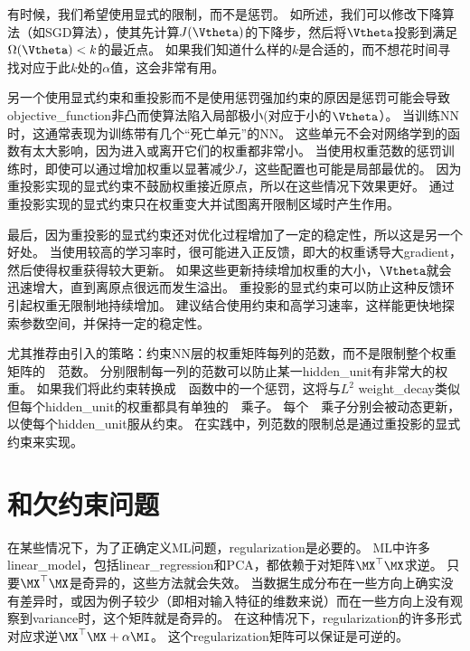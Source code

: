 
有时候，我们希望使用显式的限制，而不是惩罚。
如所述，我们可以修改下降算法（如\gls{SGD}算法），使其先计算$J(\Vtheta)$的下降步，然后将$\Vtheta$投影到满足$\Omega(\Vtheta) < k$的最近点。
如果我们知道什么样的$k$是合适的，而不想花时间寻找对应于此$k$处的$\alpha$值，这会非常有用。

另一个使用显式约束和重投影而不是使用惩罚强加约束的原因是惩罚可能会导致\gls{objective_function}非凸而使算法陷入局部极小(对应于小的$\Vtheta$）。
当训练\gls{NN}时，这通常表现为训练带有几个``死亡单元''的\gls{NN}。
这些单元不会对网络学到的函数有太大影响，因为进入或离开它们的权重都非常小。
当使用权重范数的惩罚训练时，即使可以通过增加权重以显著减少$J$，这些配置也可能是局部最优的。
因为重投影实现的显式约束不鼓励权重接近原点，所以在这些情况下效果更好。
通过重投影实现的显式约束只在权重变大并试图离开限制区域时产生作用。

最后，因为重投影的显式约束还对优化过程增加了一定的稳定性，所以这是另一个好处。
当使用较高的学习率时，很可能进入正反馈，即大的权重诱导大\gls{gradient}，然后使得权重获得较大更新。
如果这些更新持续增加权重的大小，$\Vtheta$就会迅速增大，直到离原点很远而发生溢出。
重投影的显式约束可以防止这种反馈环引起权重无限制地持续增加。
\cite{Hinton-et-al-2012c}建议结合使用约束和高学习速率，这样能更快地探索参数空间，并保持一定的稳定性。


\cite{Hinton-et-al-2012c}尤其推荐由\cite{Srebro-Shraibman-2005}引入的策略：约束\gls{NN}层的权重矩阵每列的范数，而不是限制整个权重矩阵的~~范数。
分别限制每一列的范数可以防止某一\gls{hidden_unit}有非常大的权重。
如果我们将此约束转换成~~函数中的一个惩罚，这将与$L^2$ \gls{weight_decay}类似但每个\gls{hidden_unit}的权重都具有单独的~~乘子。
每个~~乘子分别会被动态更新，以使每个\gls{hidden_unit}服从约束。
在实践中，列范数的限制总是通过重投影的显式约束来实现。

\section{和欠约束问题}
\label{sec:regularization_and_under_constrained_problems}
在某些情况下，为了正确定义\gls{ML}问题，\gls{regularization}是必要的。
\gls{ML}中许多\gls{linear_model}，包括\gls{linear_regression}和PCA，都依赖于对矩阵$\MX^\top\MX$求逆。
只要$\MX^\top\MX$是奇异的，这些方法就会失效。
当数据生成分布在一些方向上确实没有差异时，或因为例子较少（即相对输入特征的维数来说）而在一些方向上没有观察到\gls{variance}时，这个矩阵就是奇异的。
在这种情况下，\gls{regularization}的许多形式对应求逆$\MX^\top\MX + \alpha \MI$。
这个\gls{regularization}矩阵可以保证是可逆的。

